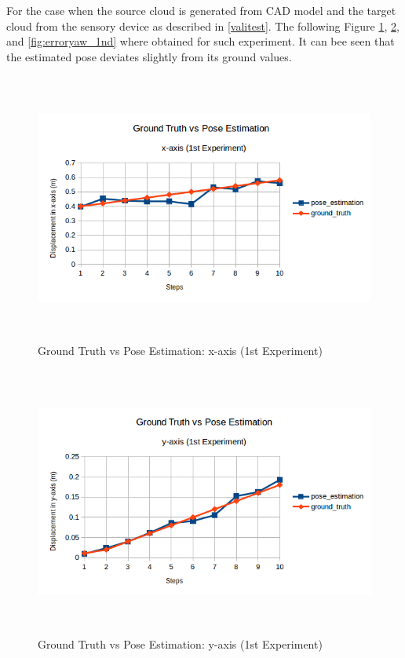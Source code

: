 For the case when the source cloud is generated from CAD model and the target cloud from the sensory device as described in \ref{valitest}. The following Figure \ref{fig:errorx_1nd}, \ref{fig:errory_1nd}, and \ref{fig:erroryaw_1nd} where obtained for such experiment. It can bee seen that the estimated pose deviates slightly from its ground values.
\begin{figure}[!h]
\begin{center}
\includegraphics[width=5in, height=3.5in]{figures05/1_x_validation.png}
\caption{Ground Truth vs Pose Estimation: x-axis (1st Experiment)}
\label{fig:errorx_1nd}
\end{center}
\end{figure}
\begin{figure}[!h]
\begin{center}
\includegraphics[width=5in, height=3.5in]{figures05/1_y_validation.png}
\caption{Ground Truth vs Pose Estimation: y-axis (1st Experiment)}
\label{fig:errory_1nd}
\end{center}
\end{figure}
